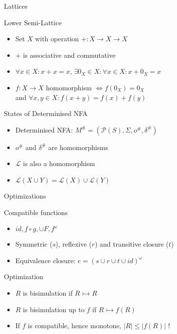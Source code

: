 \begin{frame}{Lattices}
  \begin{block}{Lower Semi-Lattice}
    \begin{itemize}
      \item Set $X$ with operation $+: X \to X \to X$
      \item $+$ is associative and commutative
      \item $\forall x \in X: x + x = x$, $\exists 0_X \in X: \forall x \in X: x + 0_X = x$
      \item $f: X \to X$ homomorphism $\Leftrightarrow f(0_X) = 0_X $\\
            and $\forall x, y \in X: f(x+y) = f(x) + f(y)$
    \end{itemize}
  \end{block}
\end{frame}

\begin{frame}{States of Determinised NFA}
  \begin{itemize}
    \item Determinised NFA: $M^\# = (\mathcal{P}(S), \Sigma, o^\#, \delta^\#)$
    \item $o^\#$ and $\delta^\#$ are homomorphisms
    \item $\mathcal{L}$ is also a homomorphism
    \item $\mathcal{L}(X \cup Y) = \mathcal{L}({X}) \cup \mathcal{L}({Y})$
  \end{itemize}
\end{frame}

\begin{frame}{Optimizations}
  \begin{block}{Compatible functions}
    \begin{itemize}
      \item $id, f \circ g, \cup F, f^\omega$
      \item Symmetric ($s$), reflexive ($r$) and transitive closure ($t$)
      \item Equivalence closure: $e = (s \cup r \cup t \cup id)^\omega$
    \end{itemize}
  \end{block}

  \begin{block}{Optimization}
    \begin{itemize}
      \item $R$ is bisimulation if $R \rightarrowtail R$
      \item $R$ is bisimulation up to $f$ if $R \rightarrowtail f(R)$
      \item If $f$ is compatible, hence monotone, $|R| \leq |f(R)|$ !
    \end{itemize}
  \end{block}
\end{frame}

